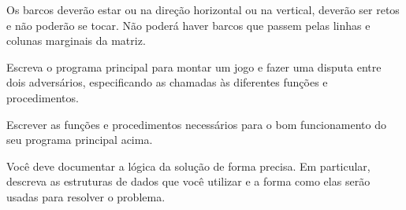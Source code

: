 \begin{enumerate}
Os barcos deverão estar ou na direção horizontal ou na vertical, deverão 
ser retos e não poderão se tocar. Não poderá haver barcos que passem pelas 
linhas e colunas marginais da matriz.

Escreva o programa principal para montar um jogo e fazer uma disputa entre 
dois adversários, especificando as chamadas às diferentes funções e 
procedimentos.

Escrever as funções e procedimentos necessários para o bom funcionamento do
seu programa principal acima.

Você deve documentar a lógica da solução de forma precisa. Em particular, 
descreva as estruturas de dados que você utilizar e a forma como elas serão 
usadas para resolver o problema.

%
%
%

\end{enumerate}
